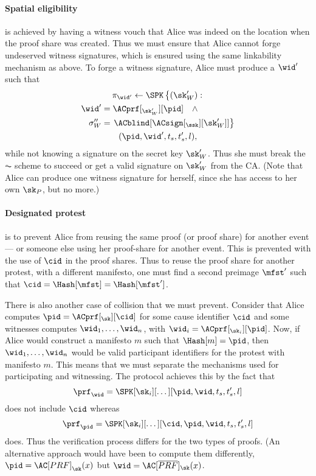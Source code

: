\paragraph{Spatial eligibility}%
\label{analysis-spatial}

 is achieved by having a witness vouch that Alice was 
indeed on the location when the proof share was created.
Thus we must ensure that Alice cannot forge undeserved witness signatures, which 
is ensured using the same linkability mechanism as above.
To forge a witness signature, Alice must produce a \(\wid'\) such that
\begin{multline*}
  \pi_{\wid'}\gets \SPK\left\{ (\sk_W') : \right. \\
    \begin{aligned}
      \wid' &= \ACprf[_{\sk_W'}][\pid] \quad \land \\
      \sigma_W'' &= \left. \ACblind[\ACsign[_{\ssk}][\sk_W']] \right\}
    \end{aligned} \\
      (\pid, \wid', t_s, t_s', l),
\end{multline*}
while not knowing a signature on the secret key \(\sk_W'\).
Thus she must break the \(\AC\) scheme to succeed or get a valid signature on 
\(\sk_W'\) from the \ac{CA}.
(Note that Alice can produce one witness signature for herself, since she has 
access to her own \(\sk_P\), but no more.)

\paragraph{Designated protest}%
\label{analysis-designated}

 is to prevent Alice from reusing the same proof (or proof 
share) for another event --- or someone else using her proof-share for another 
event.
This is prevented with the use of \(\cid\) in the proof shares.
Thus to reuse the proof share for another protest, with a different manifesto, 
one must find a second preimage \(\mfst'\) such that \(\cid = \Hash[\mfst] = 
  \Hash[\mfst']\).

There is also another case of collision that we must prevent.
Consider that Alice computes \(\pid = \ACprf[_\sk][\cid]\) for some cause 
identifier \(\cid\) and some witnesses computes \(\wid_1, \dotsc, \wid_n\), 
with \(\wid_i = \ACprf[_{\sk_i}][\pid]\).
Now, if Alice would construct a manifesto \(m\) such that \(\Hash[m] = \pid\), 
then \(\wid_1, \dotsc, \wid_n\) would be valid participant identifiers for the 
protest with manifesto \(m\).
This means that we must separate the mechanisms used for participating and 
witnessing.
The protocol achieves this by the fact that \[
  \prf_{\wid} = \SPK[\sk_i][\dotsc][\pid, \wid, t_s, t_s', l]
\]
does not include \(\cid\) whereas \[
  \prf_{\pid} = \SPK[\sk_i][\dotsc][\cid, \pid, \wid, t_s, t_s', l]
\]
does.
Thus the verification process differs for the two types of proofs.
(An alternative approach would have been to compute them differently, \eg 
\(\pid = \AC[PRF]_{\sk}(x)\) but \(\wid = \AC[\overline{PRF}]_{\sk}(x)\).

